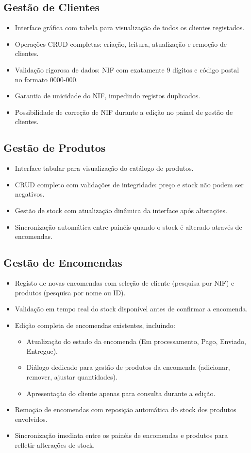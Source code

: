 \documentclass[a4paper,12pt]{article}
\begin{document}
\subsection{Gestão de Clientes}
\begin{itemize}
    \item Interface gráfica com tabela para visualização de todos os clientes registados.
    \item Operações CRUD completas: criação, leitura, atualização e remoção de clientes.
    \item Validação rigorosa de dados: NIF com exatamente 9 dígitos e código postal no formato 0000-000.
    \item Garantia de unicidade do NIF, impedindo registos duplicados.
    \item Possibilidade de correção de NIF durante a edição no painel de gestão de clientes.
\end{itemize}

\subsection{Gestão de Produtos}
\begin{itemize}
    \item Interface tabular para visualização do catálogo de produtos.
    \item CRUD completo com validações de integridade: preço e stock não podem ser negativos.
    \item Gestão de stock com atualização dinâmica da interface após alterações.
    \item Sincronização automática entre painéis quando o stock é alterado através de encomendas.
\end{itemize}

\subsection{Gestão de Encomendas}
\begin{itemize}
    \item Registo de novas encomendas com seleção de cliente (pesquisa por NIF) e produtos (pesquisa por nome ou ID).
    \item Validação em tempo real do stock disponível antes de confirmar a encomenda.
    \item Edição completa de encomendas existentes, incluindo:
    \begin{itemize}
        \item Atualização do estado da encomenda (Em processamento, Pago, Enviado, Entregue).
        \item Diálogo dedicado para gestão de produtos da encomenda (adicionar, remover, ajustar quantidades).
        \item Apresentação do cliente apenas para consulta durante a edição.
    \end{itemize}
    \item Remoção de encomendas com reposição automática do stock dos produtos envolvidos.
    \item Sincronização imediata entre os painéis de encomendas e produtos para refletir alterações de stock.
\end{itemize}
\end{document}
